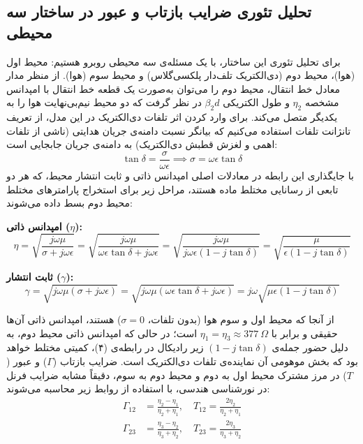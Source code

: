 \documentclass{article}
\begin{document}
	\subsection{تحلیل تئوری ضرایب بازتاب و عبور در ساختار سه محیطی}
	برای تحلیل تئوری این ساختار، با یک مسئله‌ی سه محیطی روبرو هستیم: محیط اول (هوا)، محیط دوم (دی‌الکتریک تلف‌دار پلکسی‌گلاس) و محیط سوم (هوا). از منظر مدار معادل خط انتقال، محیط دوم را می‌توان به‌صورت یک قطعه خط انتقال با امپدانس مشخصه $\eta_2$ و طول الکتریکی $\beta_2 d$ در نظر گرفت که دو محیط نیم‌بی‌نهایت هوا را به یکدیگر متصل می‌کند. برای وارد کردن اثر تلفات دی‌الکتریک در این مدل، از تعریف تانژانت تلفات استفاده می‌کنیم که بیانگر نسبت دامنه‌ی جریان هدایتی (ناشی از تلفات اهمی و لغزش قطبش دی‌الکتریک) به دامنه‌ی جریان جابجایی است:
	\begin{equation}
		\tan\delta = \frac{\sigma}{\omega\epsilon} \implies \sigma = \omega\epsilon\tan\delta
	\end{equation}
	با جایگذاری این رابطه در معادلات اصلی امپدانس ذاتی و ثابت انتشار محیط، که هر دو تابعی از رسانایی مختلط ماده هستند، مراحل زیر برای استخراج پارامترهای مختلط محیط دوم بسط داده می‌شوند:
	
	\textbf{امپدانس ذاتی ($\eta$):}
	\begin{equation}
		\eta = \sqrt{\frac{j\omega\mu}{\sigma + j\omega\epsilon}} = \sqrt{\frac{j\omega\mu}{\omega\epsilon\tan\delta + j\omega\epsilon}} = \sqrt{\frac{j\omega\mu}{j\omega\epsilon\left(1 - j\tan\delta\right)}} = \sqrt{\frac{\mu}{\epsilon\left(1 - j\tan\delta\right)}}
	\end{equation}
	
	\textbf{ثابت انتشار ($\gamma$):}
	\begin{equation}
		\gamma = \sqrt{j\omega\mu(\sigma + j\omega\epsilon)} = \sqrt{j\omega\mu(\omega\epsilon\tan\delta + j\omega\epsilon)} = j\omega\sqrt{\mu\epsilon\left(1 - j\tan\delta\right)}
	\end{equation}
	
	از آنجا که محیط اول و سوم هوا (بدون تلفات، $\sigma=0$) هستند، امپدانس ذاتی آن‌ها حقیقی و برابر با $\eta_1 = \eta_3 \approx 377 \ \Omega$ است؛ در حالی که امپدانس ذاتی محیط دوم، به دلیل حضور جمله‌ی $(1-j\tan\delta)$ زیر رادیکال در رابطه‌ی (۴)، کمیتی مختلط خواهد بود که بخش موهومی آن نماینده‌ی تلفات دی‌الکتریک است. ضرایب بازتاب ($\Gamma$) و عبور ($T$) در مرز مشترک محیط اول به دوم و محیط دوم به سوم، دقیقاً مشابه ضرایب فرنل در نورشناسی هندسی، با استفاده از روابط زیر محاسبه می‌شوند:
	\begin{align*}
		\Gamma_{12} &= \frac{\eta_2 - \eta_1}{\eta_2 + \eta_1}, \quad T_{12} = \frac{2\eta_2}{\eta_2 + \eta_1} \\
		\Gamma_{23} &= \frac{\eta_3 - \eta_2}{\eta_3 + \eta_2}, \quad T_{23} = \frac{2\eta_3}{\eta_3 + \eta_2}
	\end{align*}
	
\end{document}
